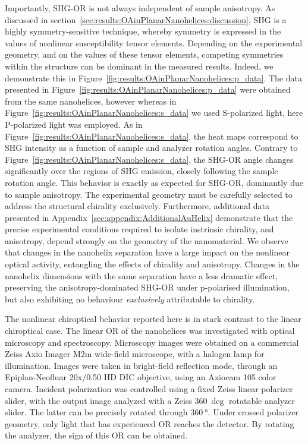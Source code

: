 Importantly, SHG-OR is not always independent of sample anisotropy. As discussed in section~\ref{sec:results:OAinPlanarNanohelices:discussion}, SHG is a highly symmetry-sensitive technique, whereby symmetry is expressed in the values of nonlinear susceptibility tensor elements. Depending on the experimental geometry, and on the values of these tensor elements, competing symmetries within the structure can be dominant in the measured results. Indeed, we demonstrate this in Figure~\ref{fig:results:OAinPlanarNanohelices:p_data}. The data presented in Figure~\ref{fig:results:OAinPlanarNanohelices:p_data} were obtained from the same nanohelices, however whereas in Figure~\ref{fig:results:OAinPlanarNanohelices:s_data} we used S-polarized light, here P-polarized light was employed. As in Figure~\ref{fig:results:OAinPlanarNanohelices:s_data}, the heat maps correspond to SHG intensity as a function of sample and analyzer rotation angles. Contrary to Figure~\ref{fig:results:OAinPlanarNanohelices:s_data}, the SHG-OR angle changes significantly over the regions of SHG emission, closely following the sample rotation angle. This behavior is exactly as expected for SHG-OR, dominantly due to sample anisotropy. The experimental geometry must be carefully selected to address the structural chirality exclusively. 
Furthermore, additional data presented in Appendix~\ref{sec:appendix:AdditionalAuHelix} demonstrate that the precise experimental conditions required to isolate instrinsic chirality, and anisotropy, depend strongly on the geometry of the nanomaterial. We observe that changes in the nanohelix separation have a large impact on the nonlinear optical activity, entangling the effects of chirality and anisotropy. Changes in the nanohelix dimensions with the same separation have a less dramatic effect, preserving the anisotropy-dominated SHG-OR under p-polarised illumination, but also exhibiting no behaviour \textit{exclusively} attributable to chirality.

The nonlinear chiroptical behavior reported here is in stark contrast to the linear chiroptical case. The linear OR of the nanohelices was investigated with optical microscopy and spectroscopy. 
Microscopy images were obtained on a commercial Zeiss Axio Imager M2m wide-field microscope, with a halogen lamp for illumination. Images were taken in bright-field reflection mode, through an Epiplan-Neofluar 20x/0.50 HD DIC objective, using an Axiocam 105 color camera. Incident polarization was controlled using a fixed Zeiss linear polarizer slider, with the output image analyzed with a Zeiss $\SI{360}{\deg}$ rotatable analyzer slider. 
The latter can be precisely rotated through $\SI{360}{\degree}$. Under crossed polarizer geometry, only light that has experienced OR reaches the detector. By rotating the analyzer, the sign of this OR can be obtained. 


